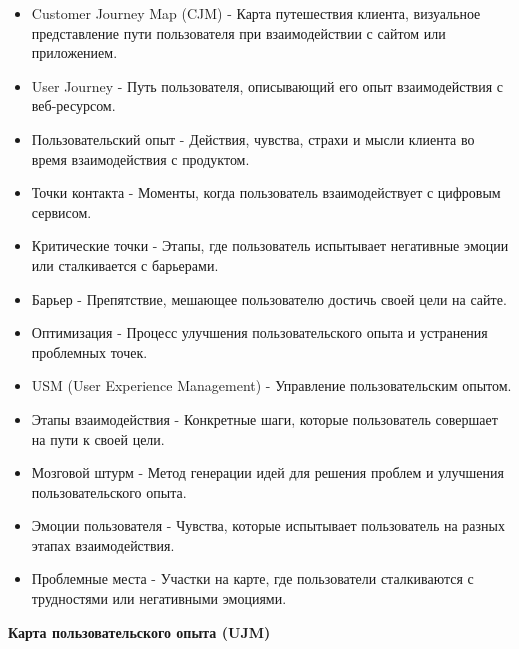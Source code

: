 \begin{itemize}
    \item Customer Journey Map (CJM) - Карта путешествия клиента, визуальное представление пути пользователя при взаимодействии с сайтом или приложением.
    \item User Journey - Путь пользователя, описывающий его опыт взаимодействия с веб-ресурсом.
    \item Пользовательский опыт - Действия, чувства, страхи и мысли клиента во время взаимодействия с продуктом.
    \item Точки контакта - Моменты, когда пользователь взаимодействует с цифровым сервисом.
    \item Критические точки - Этапы, где пользователь испытывает негативные эмоции или сталкивается с барьерами.
    \item Барьер - Препятствие, мешающее пользователю достичь своей цели на сайте.
    \item Оптимизация - Процесс улучшения пользовательского опыта и устранения проблемных точек.
    \item USM (User Experience Management) - Управление пользовательским опытом.
    \item Этапы взаимодействия - Конкретные шаги, которые пользователь совершает на пути к своей цели.
    \item Мозговой штурм - Метод генерации идей для решения проблем и улучшения пользовательского опыта.
    \item Эмоции пользователя - Чувства, которые испытывает пользователь на разных этапах взаимодействия.
    \item Проблемные места - Участки на карте, где пользователи сталкиваются с трудностями или негативными эмоциями.
\end{itemize}
\bigskip

\textbf{Карта пользовательского опыта (UJM)}

